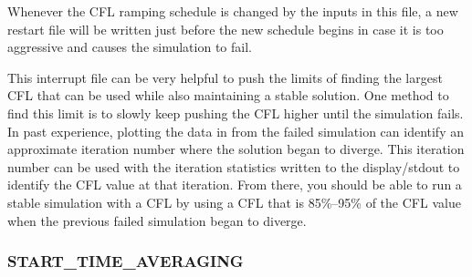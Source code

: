 
Whenever the CFL ramping schedule is changed by the inputs in this file, a new
restart file will be written just before the new schedule begins in case it is
too aggressive and causes the simulation to fail.


This interrupt file can be very helpful to push the limits of finding the
largest CFL that can be used while also maintaining a stable solution.
%
One method to find this limit is to slowly keep pushing the CFL higher until the
simulation fails.
%
In past experience, plotting the data in  from the failed
simulation can identify an approximate iteration number where the solution began
to diverge.
%
This iteration number can be used with the iteration statistics written to the
display\slash stdout to identify the CFL value at that iteration.
%
From there, you should be able to run a stable simulation with a  CFL by using a CFL that is 85\%--95\% of the CFL value when the
previous failed simulation began to diverge.


\subsubsection{START\_TIME\_AVERAGING}
\label{SEC:Files:Interrupt:Start_TA}

